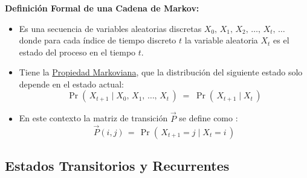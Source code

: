 \documentclass[ 10pt, xcolor = dvipsnames]{beamer}
\begin{document}
\begin{frame}[allowframebreaks]
\frametitle{\insertsubsection}

\textbf{Definici\'on Formal de una Cadena de Markov:}
\begin{itemize}
\item Es una secuencia de variables aleatorias discretas $X_0, \, X_1, \, X_2, \, \dots, \, X_t, \, \dots$ \linebreak donde para cada \'indice de tiempo discreto $t$ la variable aleatoria $X_t$ \linebreak es el estado del proceso en el tiempo $t$. 
\item Tiene la \underline{Propiedad Markoviana}, \ie que la distribuci\'on del siguiente estado solo depende en el estado actual: 
\[
\Pr( \, X_{t+1} \mid X_{0}, \, X_{1}, \, \dots, \, X_t \, ) \; = \;
\Pr( \, X_{t+1} \mid X_{t} \, )
\]
\item En este contexto la matriz de transici\'on $\vec{P}$ se define como : 
\[
\vec{P}(i,j) \, = \,
\Pr( \, X_{t+1} = j \mid X_{t} = i \, )
\]
\end{itemize}

\end{frame}

\subsection{Estados Transitorios y Recurrentes}
\end{document}

